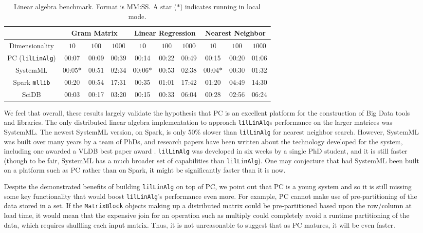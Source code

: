 \begin{table}[h!]
\begin{center}
\begin{tabular}{|c||c|c|c||c|c|c||c|c|c|}
\hline
& \multicolumn{3}{c||}{Gram Matrix} & \multicolumn{3}{c||}{Linear Regression} & \multicolumn{3}{c|}{Nearest Neighbor} \\
\hline
Dimensionality & $10$ & $100$ & $1000$& $10$ & $100$ & $1000$& $10$ & $100$ & $1000$ \\
\hline
\hline
PC (\texttt{lilLinAlg}) &00:07 & 00:09 &00:39 &00:14 &00:22 &00:49& 00:15 & 00:20 & 01:06 \\
SystemML &00:05$*$ &00:51 &02:34 &00:06$*$ &00:53 &02:38 &00:04$*$ &00:30 &01:32 \\
Spark \texttt{mllib} &00:20  &00:54 &17:31 &00:35 &01:01 &17:42 &01:20 & 04:49 &14:30 \\
SciDB   &00:03 &00:17 &03:20 &00:15 &00:33 &06:04 &00:28 &02:56 & 06:24 \\
\hline
\end{tabular}
\caption{Linear algebra benchmark. Format is MM:SS.
A star ($*$) indicates running in local mode.}
\label{fig:LR}
\end{center}
\end{table}

We feel that overall, these results largely validate the hypothesis that PC is an excellent platform for the 
construction of Big Data tools and libraries.  The only distributed linear algebra implementation
to approach \texttt{lilLinAlg}s performance on the larger matrices
was SystemML.  The newest SystemML version, on Spark, is only 50\% slower than \texttt{lilLinAlg} for nearest neighbor search.
However,
SystemML was built over many years by a team of PhDs, and research papers have been written about the
technology developed for the system, including one awarded a VLDB best paper award \cite{boehm2016systemml}.
\texttt{lilLinAlg} was developed in six weeks by a single PhD student, and it is still
faster (though to be fair, SystemML has a much broader
set of capabilities than \texttt{lilLinAlg}).
One may conjecture that had SystemML been built on a platform such as PC rather than on Spark, it might be significantly
faster than it is now.

Despite the demonstrated benefits of building \texttt{lilLinAlg} on top of PC, we point out that
PC is a young system and so it is still missing some key functionality that would boost
\texttt{lilLinAlg}'s performance even more.  For example, PC cannot make use of pre-partitioning of the data stored in a set. 
If the
\texttt{MatrixBlock} objects making up a distributed
matrix could be pre-partitioned based upon the row/column at load time, it 
would mean that the expensive join for an operation
such as multiply could completely avoid a runtime partitioning of the data, which requires shuffling each input matrix.
Thus, it is not unreasonable to suggest that as PC matures, it will be even faster.

